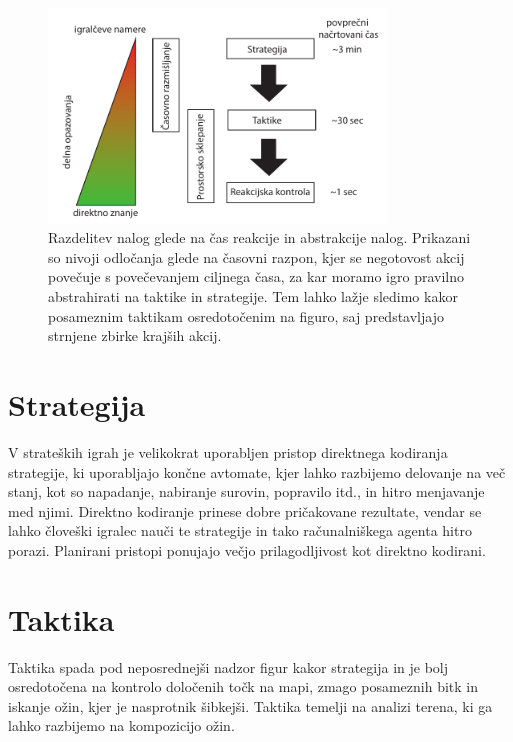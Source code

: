\documentclass[a4paper, 12pt]{book}
\begin{document}
\begin{itemize}
	\begin{figure}[t!]
		\begin{center}
			\includegraphics[width=0.8\textwidth]{photos/RazdelitevNalog.pdf}
		\end{center}
		\caption{Razdelitev nalog glede na čas reakcije in abstrakcije nalog. 
			Prikazani so nivoji odločanja glede na časovni razpon, kjer se negotovost akcij povečuje s povečevanjem ciljnega časa, za kar moramo igro pravilno abstrahirati na taktike in strategije. 
			Tem lahko lažje sledimo kakor posameznim taktikam osredotočenim na figuro, saj predstavljajo strnjene zbirke krajših akcij. }
		\label{picRazdelitevNalog}
	\end{figure}
\end{itemize}

\section{Strategija}
V strateških igrah je velikokrat uporabljen pristop direktnega kodiranja strategije, ki uporabljajo končne avtomate, kjer lahko razbijemo delovanje na več stanj, kot so napadanje, nabiranje surovin, popravilo itd., in hitro menjavanje med njimi. 
Direktno kodiranje prinese dobre pričakovane rezultate, vendar se lahko človeški igralec nauči te strategije in tako računalniškega agenta hitro porazi.
Planirani pristopi ponujajo večjo prilagodljivost kot direktno kodirani.
\section{Taktika}
Taktika spada pod neposrednejši nadzor figur kakor strategija in je bolj osredotočena na kontrolo določenih točk na mapi, zmago posameznih bitk in iskanje ožin, kjer je nasprotnik šibkejši. 
Taktika temelji na analizi terena, ki ga lahko razbijemo na kompozicijo ožin.
\end{document}

